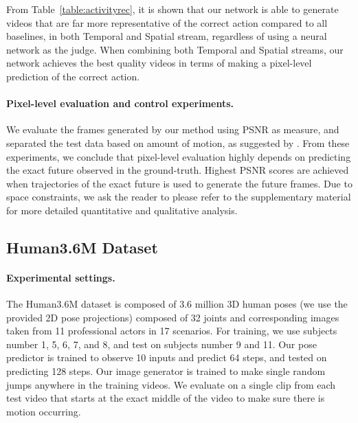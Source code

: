 \documentclass{article}
\newcommand{\cutsubsectionup}{\vspace*{-0.09in}}
\newcommand{\cutsubsectiondown}{\vspace*{-0.04in}}
\newcommand{\cutsubsectionup}{}
\newcommand{\cutsubsectiondown}{}
\begin{document}
From Table~\ref{table:activityrec}, it is shown that our network is able to generate videos that are far more representative of the correct action compared to all baselines, in both Temporal and Spatial stream, regardless of using a neural network as the judge.
When combining both Temporal and Spatial streams, our network achieves the best quality videos in terms of making a pixel-level prediction of the correct action.

\vspace{-8pt}\paragraph{Pixel-level evaluation and control experiments.}\label{exp:penn_pixel}
We evaluate the frames generated by our method using PSNR as measure, and separated the test data based on amount of motion, as suggested by \citet{Villegas17}.
From these experiments, we conclude that pixel-level evaluation highly depends on predicting the exact future observed in the ground-truth.
Highest PSNR scores are achieved when trajectories of the exact future is used to generate the future frames.
Due to space constraints, we ask the reader to please refer to the supplementary material for more detailed quantitative and qualitative analysis.

\cutsubsectionup\subsection{Human3.6M Dataset}\label{sec:experiments_h36m}\cutsubsectiondown\paragraph{Experimental settings.}
The Human3.6M dataset \cite{human36m} is composed of 3.6 million 3D human poses (we use the provided 2D pose projections) composed of 32 joints and corresponding images taken from 11 professional actors in 17 scenarios.
For training, we use subjects number 1, 5, 6, 7, and 8, and test on subjects number 9 and 11.
Our pose predictor is trained to observe 10 inputs and predict 64 steps, and tested on predicting 128 steps.
Our image generator is trained to make single random jumps anywhere in the training videos.
We evaluate on a single clip from each test video that starts at the exact middle of the video to make sure there is motion occurring.
\end{document}
